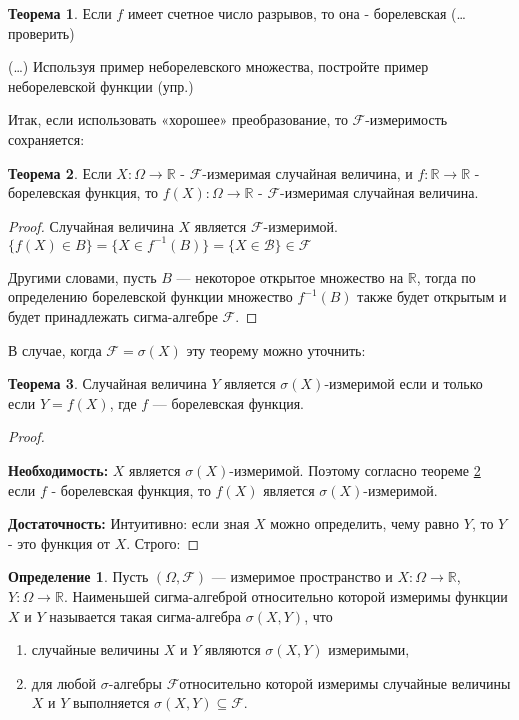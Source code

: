 \documentclass[pdftex, 12pt, a4paper]{article}
\def\R{\ensuremath{\mathbb{R}}} %
\def\F{\ensuremath{\mathcal{F}}} %
\def\B{\ensuremath{\mathcal{B}}} %
\def\s{\ensuremath{\sigma}}
\def \Om{\Omega}
\renewcommand{\to}{\rightarrow}
\theoremstyle{definition} %
\newtheorem*{mydef}{Определение}
\newtheorem{myth}{Теорема}
\numberwithin{problem}{section}
\numberwithin{blits}{section}
\begin{document}
\begin{myth} Если $f$ имеет счетное число разрывов, то она - борелевская (\ldots проверить)
\end{myth}
(\ldots ) Используя пример неборелевского множества, постройте пример неборелевской функции (упр.)

Итак, если использовать «хорошее» преобразование, то \F-измеримость сохраняется:

\begin{myth}\label{th:8} Если $X:\Omega\to\R$ - \F-измеримая случайная величина, и $f:\R\to\R$ - борелевская функция, то $f(X):\Omega\to\R$ - \F-измеримая случайная величина.
\end{myth}
\begin{proof}
Случайная величина $X$ является \F-измеримой. $\{f(X) \in B\} = \{ X \in f^{-1}(B)\} = \{X \in \B\} \in \F$ 

Другими словами, пусть $B$ --- некоторое открытое множество на $\R$, тогда по определению борелевской функции множество $f^{-1}(B)$ также будет открытым и будет принадлежать сигма-алгебре $\F$.

\end{proof}

В случае, когда $\F=\s(X)$ эту теорему можно уточнить:

\begin{myth} Случайная величина $Y$ является $\s(X)$-измеримой если и только если $Y=f(X)$, где $f$ --- борелевская функция.
\end{myth}
\begin{proof}

\mbox{ }

\textbf{Необходимость:} $X$ является $\s(X)$-измеримой. Поэтому согласно теореме \ref{th:8} если $f$ - борелевская функция, то $f(X)$ является $\s(X)$-измеримой.

\textbf{Достаточность:}  Интуитивно: если зная $X$ можно определить, чему равно $Y$, то $Y$ - это функция от $X$. Строго:


\end{proof}

\begin{mydef}
Пусть $(\Om,\F)$ --- измеримое пространство и $X \colon \Om \to \R$, $Y \colon \Om \to \R$. Наименьшей сигма-алгеброй относительно которой измеримы функции $X$ и $Y$ называется такая сигма-алгебра $\s(X,Y)$, что 
\begin{enumerate}
\item случайные величины $X$ и $Y$ являются $\s(X,Y)$ измеримыми,
\item для любой \s-алгебры \F относительно которой измеримы случайные величины $X$ и $Y$ выполняется $\s(X,Y) \subseteq \F$. 
\end{enumerate}
\end{mydef}
\end{document}
